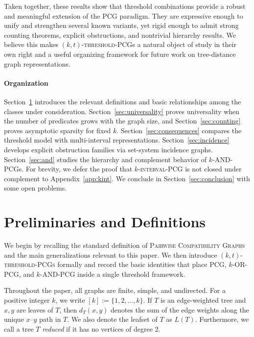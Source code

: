 \documentclass[a4paper,UKenglish,cleveref,autoref,thm-restate]{socg-lipics-v2021}
\begin{document}
Taken together, these results show that threshold combinations provide a robust and
meaningful extension of the \textsc{PCG} paradigm. They are expressive enough to unify
and strengthen several known variants, yet rigid enough to admit strong counting
theorems, explicit obstructions, and nontrivial hierarchy results. We believe this makes
\textsc{$(k,t)$-threshold-\textsc{PCG}}s a natural object of study in their own right and
a useful organizing framework for future work on tree-distance graph representations.

\paragraph*{Organization}
Section~\ref{sec:preliminaries} introduces the relevant definitions and basic
relationships among the classes under consideration.
Section~\ref{sec:universality} proves universality when the number of predicates grows
with the graph size, and Section~\ref{sec:counting} proves asymptotic sparsity for fixed
\(k\).
Section~\ref{sec:consequences} compares the threshold model with multi-interval
representations.
Section~\ref{sec:incidence} develops explicit obstruction families via set-system
incidence graphs.
Section~\ref{sec:and} studies the hierarchy and complement behavior of
\textsc{$k$-\textsc{AND}-\textsc{PCG}}s.  For brevity, we defer the proof that
\textsc{$k$-interval-\textsc{PCG}} is not closed under complement to Appendix~\ref{app:kint}. We conclude in Section~\ref{sec:conclusion} with some open problems. 

\section{Preliminaries and Definitions}\label{sec:preliminaries}

We begin by recalling the standard definition of \textsc{Pairwise Compatibility Graphs} and the main generalizations relevant to this paper. We then introduce \textsc{$(k,t)$-threshold-\textsc{PCG}s} formally and record the basic identities that place \textsc{PCG}, \textsc{$k$-\textsc{OR}-\textsc{PCG}}, and \textsc{$k$-\textsc{AND}-\textsc{PCG}} inside a single threshold framework.

Throughout the paper, all graphs are finite, simple, and undirected. For a positive integer $k$, we write
\(
[k]:=\{1,2,\dots,k\}.
\)
If $T$ is an edge-weighted tree and $x,y$ are leaves of $T$, then $d_T(x,y)$ denotes the sum of the edge weights along the unique $x$--$y$ path in $T$. We also denote the leafset of $T$ as $L(T)$. Furthermore, we call a tree $T$ \textit{reduced} if it has no vertices of degree 2.
\end{document}
